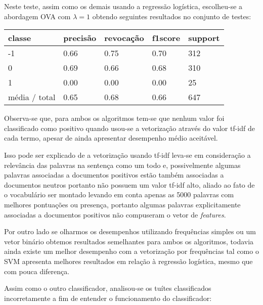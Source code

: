 Neste teste, assim como os demais usando a regressão logística, escolheu-se a abordagem OVA com
$\lambda = 1$ obtendo seguintes resultados no conjunto de testes:

\begin{table}[H]
	\centering
		\begin{tabular}{l | l | l | l | l}
		\hline
		classe  	&	precisão  &  revocação &  f1\-score &  support \\
		\hline
		 -1    &   0.66   &   0.75   &   0.70   &    312 \\
		 \hline
          0    &   0.69   &   0.66   &   0.68   &    310 \\
          \hline
          1    &   0.00   &   0.00   &   0.00    &    25 \\
		\hline
		média / total   &    0.65   &   0.68   &   0.66   &    647 \\
		\hline
	\end{tabular}
\end{table}

Observa-se que, para ambos os algoritmos tem-se que nenhum valor foi classificado como
positivo quando usou-se a vetorização através do valor tf-idf de cada termo, apesar de ainda
apresentar desempenho médio aceitável. 

Isso pode ser explicado de a vetorização usando tf-idf
leva-se em consideração a relevância das palavras na sentença como um todo e, possivelmente
algumas palavras associadas a documentos positivos estão também associadas
a documentos neutros portanto não possuem um valor tf-idf alto, aliado ao fato de o vocabulário
ser montado levando em conta apenas as 5000 palavras com melhores pontuações ou presença, portanto
algumas palavras explicitamente associadas a documentos positivos não compuseram o vetor de
\textit{features}.

Por outro lado se olharmos os desempenhos utilizando frequências simples ou um vetor binário
obtemos resultados semelhantes para ambos os algoritmos, todavia ainda existe um melhor desempenho
com a vetorização por frequências tal como o SVM apresenta melhores resultados em relação à regressão
logística, mesmo que com pouca diferença.

Assim como o outro classificador, analisou-se os tuítes classificados incorretamente a fim de
entender o funcionamento do classificador:

